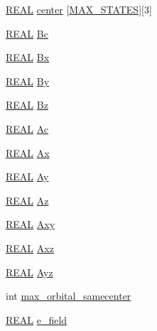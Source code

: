 \begin{DoxyCompactItemize}
\item 
\hyperlink{md_8h_a4b654506f18b8bfd61ad2a29a7e38c25}{R\-E\-A\-L} \hyperlink{struct_c_o_n_t_r_o_l_af7035048aa78ea2c1cc56da176f35133}{center} \mbox{[}\hyperlink{_t_d_d_f_t_2_headers_2params_8h_a9568de9296df1e94aeb0b7f24cc678a9}{M\-A\-X\-\_\-\-S\-T\-A\-T\-E\-S}\mbox{]}\mbox{[}3\mbox{]}
\item 
\hyperlink{md_8h_a4b654506f18b8bfd61ad2a29a7e38c25}{R\-E\-A\-L} \hyperlink{struct_c_o_n_t_r_o_l_a7b78d2b9d2565ca420cd9fb1ac805141}{Bc}
\item 
\hyperlink{md_8h_a4b654506f18b8bfd61ad2a29a7e38c25}{R\-E\-A\-L} \hyperlink{struct_c_o_n_t_r_o_l_a03600121a378b398ba3f62b986c57788}{Bx}
\item 
\hyperlink{md_8h_a4b654506f18b8bfd61ad2a29a7e38c25}{R\-E\-A\-L} \hyperlink{struct_c_o_n_t_r_o_l_a4f1bec71294c157d83fdf1e168322f02}{By}
\item 
\hyperlink{md_8h_a4b654506f18b8bfd61ad2a29a7e38c25}{R\-E\-A\-L} \hyperlink{struct_c_o_n_t_r_o_l_aca09cbc6301ce10bc4612d99a53fede6}{Bz}
\item 
\hyperlink{md_8h_a4b654506f18b8bfd61ad2a29a7e38c25}{R\-E\-A\-L} \hyperlink{struct_c_o_n_t_r_o_l_a57159cf3ac6a2b7456ff0c2ed3f23ef6}{Ac}
\item 
\hyperlink{md_8h_a4b654506f18b8bfd61ad2a29a7e38c25}{R\-E\-A\-L} \hyperlink{struct_c_o_n_t_r_o_l_ad1640927a57876f14da88af42d9fdfbd}{Ax}
\item 
\hyperlink{md_8h_a4b654506f18b8bfd61ad2a29a7e38c25}{R\-E\-A\-L} \hyperlink{struct_c_o_n_t_r_o_l_a4c1085f803ec37b83234d70eb988ef67}{Ay}
\item 
\hyperlink{md_8h_a4b654506f18b8bfd61ad2a29a7e38c25}{R\-E\-A\-L} \hyperlink{struct_c_o_n_t_r_o_l_a74c8b470add172b7fb3eddded41ae7e4}{Az}
\item 
\hyperlink{md_8h_a4b654506f18b8bfd61ad2a29a7e38c25}{R\-E\-A\-L} \hyperlink{struct_c_o_n_t_r_o_l_a45282b2ca620809b929bc69bccdb1d8e}{Axy}
\item 
\hyperlink{md_8h_a4b654506f18b8bfd61ad2a29a7e38c25}{R\-E\-A\-L} \hyperlink{struct_c_o_n_t_r_o_l_ab0f6acf418b00ced0ff4ad5bd2c34030}{Axz}
\item 
\hyperlink{md_8h_a4b654506f18b8bfd61ad2a29a7e38c25}{R\-E\-A\-L} \hyperlink{struct_c_o_n_t_r_o_l_a0fc026f12322b4d1181d9deeedd4f466}{Ayz}
\item 
int \hyperlink{struct_c_o_n_t_r_o_l_af91d651f57d9494760902a37244e49e1}{max\-\_\-orbital\-\_\-samecenter}
\item 
\hyperlink{md_8h_a4b654506f18b8bfd61ad2a29a7e38c25}{R\-E\-A\-L} \hyperlink{struct_c_o_n_t_r_o_l_a4fed6f3a5ad93eadc25ba33025fead3d}{e\-\_\-field}

\end{DoxyCompactItemize}
